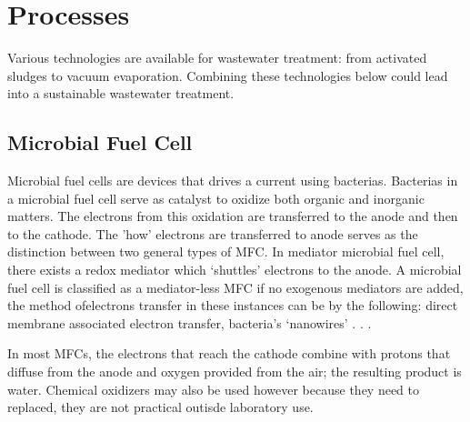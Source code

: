 \documentclass[10pt,a4paper,hidelinks]{article}
\begin{document}
    \pagestyle{plain}
    \title{\rmfamily\normalfont{}}
    \author{}
    \date{} %
    
    \maketitle
    
    \begin{abstract}
        \noindent Current wastewater treatment processes and technologies left much to be desired. Wastewater could be a valuable source of energy --- about 9 times more energy are in wastewater compared to the energy needed to proccess them in a modern plant. Present processes do not generally take this into account moreover, they are also generally inefficient and 'unclean'. Combining present technologies, such as and especially Microbial Fuel Cell (MFC) could help alleviate these present issues considering wastewater treatment. 
    \end{abstract}
       
    \tableofcontents
    
    \section{Processes}
    Various technologies are available for wastewater treatment: from activated sludges to vacuum evaporation. Combining these technologies below could lead into a sustainable wastewater treatment.
    \subsection{Microbial Fuel Cell}
    Microbial fuel cells are devices that drives a current using bacterias. Bacterias in a microbial fuel cell serve as catalyst to oxidize both organic
and inorganic matters.  The electrons from this oxidation are transferred to the anode and then to the cathode.  The 'how' electrons are transferred to anode serves as the distinction between two general types of MFC. In mediator microbial fuel cell, there exists a redox mediator which ‘shuttles’ electrons to the anode. A microbial fuel cell is classified as a mediator-less MFC if no exogenous mediators are added,  the method ofelectrons transfer in these instances can be by the following: direct membrane associated electron transfer, bacteria’s ‘nanowires’ . . .


In most MFCs, the electrons that reach the cathode combine with protons
that diffuse from the anode and oxygen provided from the  air;  the  resulting  product  is  water.   Chemical  oxidizers  may  also  be
used however because they need to replaced, they are not practical outisde laboratory use.
\end{document}

